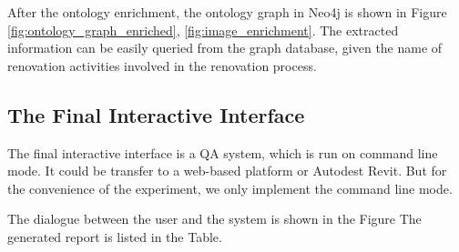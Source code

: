 After the ontology enrichment, the ontology graph in Neo4j is shown in Figure \ref{fig:ontology_graph_enriched}, \ref{fig:image_enrichment}.
The extracted information can be easily queried from the graph database, given the name of renovation activities involved in the renovation process.

\subsection{The Final Interactive Interface}
The final interactive interface is a QA system, which is run on command line mode. It could be transfer to a web-based platform
or Autodest Revit. But for the convenience of the experiment, we only implement the command line mode.

The dialogue between the user and the system is shown in the Figure %
The generated report is listed in the Table.
        




